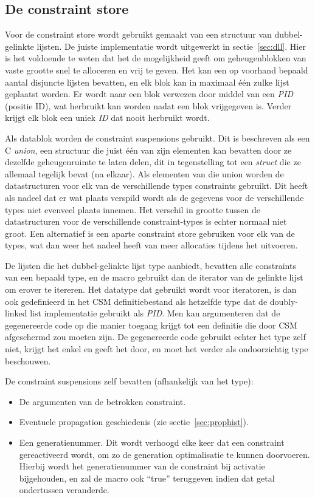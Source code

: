 \subsection{De constraint store} \label{sec:constore}

Voor de constraint store wordt gebruikt gemaakt van een structuur van dubbel-gelinkte lijsten. De juiste implementatie wordt uitgewerkt in sectie~\ref{sec:dll}. Hier is het voldoende te weten dat het de mogelijkheid geeft om geheugenblokken van vaste grootte snel te alloceren en vrij te geven. Het kan een op voorhand bepaald aantal disjuncte lijsten bevatten, en elk blok kan in maximaal \'e\'en zulke lijst geplaatst worden. Er wordt naar een blok verwezen door middel van een {\em PID} (positie ID), wat herbruikt kan worden nadat een blok vrijgegeven is. Verder krijgt elk blok een uniek {\em ID} dat nooit herbruikt wordt.

Als datablok worden de constraint suspensions gebruikt. Dit is beschreven als een C {\em union}, een structuur die juist \'e\'en van zijn elementen kan bevatten door ze dezelfde geheugenruimte te laten delen, dit in tegenstelling tot een {\em struct} die ze allemaal tegelijk bevat (na elkaar). Als elementen van die union worden de datastructuren voor elk van de verschillende types constraints gebruikt. Dit heeft als nadeel dat er wat plaats verspild wordt als de gegevens voor de verschillende types niet evenveel plaats innemen. Het verschil in grootte tussen de datastructuren voor de verschillende constraint-types is echter normaal niet groot. Een alternatief is een aparte constraint store gebruiken voor elk van de types, wat dan weer het nadeel heeft van meer allocaties tijdens het uitvoeren.

De lijsten die het dubbel-gelinkte lijst type aanbiedt, bevatten alle constraints van een bepaald type, en de  macro gebruikt dan de iterator van de gelinkte lijst om erover te itereren. Het  datatype dat gebruikt wordt voor iteratoren, is dan ook gedefinieerd in het CSM definitiebestand als hetzelfde type dat de doubly-linked list implementatie gebruikt als {\em PID}. Men kan argumenteren dat de gegenereerde code op die manier toegang krijgt tot een definitie die door CSM afgeschermd zou moeten zijn. De gegenereerde code gebruikt echter het  type zelf niet, krijgt het enkel en geeft het door, en moet het verder als ondoorzichtig type beschouwen.

De constraint suspensions zelf bevatten (afhankelijk van het type): \begin{itemize}
  \item De argumenten van de betrokken constraint.
  \item Eventuele propagation geschiedenis (zie sectie~\ref{sec:prophist}).
  \item Een generatienummer. Dit wordt verhoogd elke keer dat een constraint gereactiveerd wordt, om zo de generation optimalisatie te kunnen doorvoeren. Hierbij wordt het generatienummer van de constraint bij activatie bijgehouden, en zal de  macro ook ``true'' teruggeven indien dat getal ondertussen veranderde.
\end{itemize}

